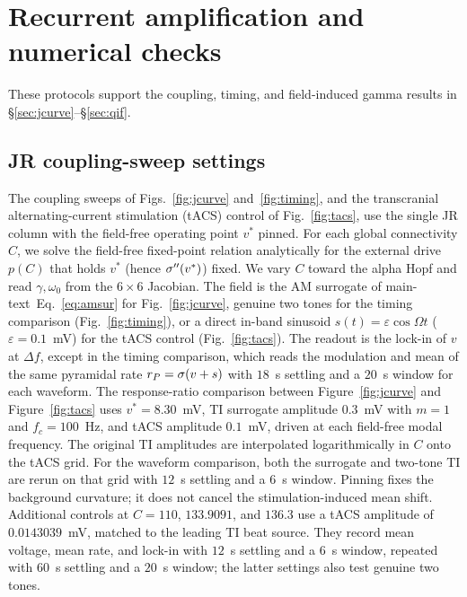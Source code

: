 \section{Recurrent amplification and numerical checks}\label{supp:amplification}
These protocols support the coupling, timing, and field-induced gamma results in
\S\ref{sec:jcurve}--\S\ref{sec:qif}.
\subsection{JR coupling-sweep settings}\label{app:jr-sweep-settings}
The coupling sweeps of Figs.~\ref{fig:jcurve} and~\ref{fig:timing}, and the transcranial alternating-current stimulation (tACS) control of Fig.~\ref{fig:tacs}, use the single JR column with the field-free operating point $v^*$ pinned. For each global connectivity $C$, we solve the field-free fixed-point relation analytically for the external drive $p(C)$ that holds $v^*$ (hence $\sigma''(v^*)$) fixed. We vary $C$ toward the alpha Hopf and read $\gamma,\omega_0$ from the $6\times6$ Jacobian. The field is the AM surrogate of \ifsupp main-text\fi\ Eq.~\eqref{eq:amsur} for Fig.~\ref{fig:jcurve}, genuine two tones for the timing comparison (Fig.~\ref{fig:timing}), or a direct in-band sinusoid $s(t)=\varepsilon\cos\Omega t$ ($\varepsilon=0.1$~mV) for the tACS control (Fig.~\ref{fig:tacs}). The readout is the lock-in of $v$ at $\Delta f$, except in the timing comparison, which reads the modulation and mean of the same pyramidal rate $r_P=\sigma(v+s)$ with $18$~s settling and a $20$~s window for each waveform. The response-ratio comparison between Figure~\ref{fig:jcurve} and Figure~\ref{fig:tacs} uses $v^*=8.30$~mV, TI surrogate amplitude $0.3$~mV with $m=1$ and $f_c=100$~Hz, and tACS amplitude $0.1$~mV, driven at each field-free modal frequency. The original TI amplitudes are interpolated logarithmically in $C$ onto the tACS grid. For the waveform comparison, both the surrogate and two-tone TI are rerun on that grid with $12$~s settling and a $6$~s window. Pinning fixes the background curvature; it does not cancel the stimulation-induced mean shift. Additional controls at $C=110$, $133.9091$, and $136.3$ use a tACS amplitude of $0.0143039$~mV, matched to the leading TI beat source. They record mean voltage, mean rate, and lock-in with $12$~s settling and a $6$~s window, repeated with $60$~s settling and a $20$~s window; the latter settings also test genuine two tones.


\ifjne

\fi


